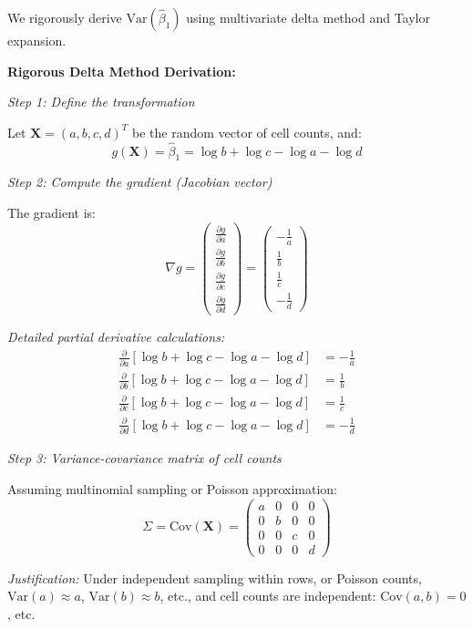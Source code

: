 \documentclass[12pt]{article}
\begin{document}
\begin{solution}
We rigorously derive $\text{Var}(\hat{\beta}_1)$ using multivariate delta method and Taylor expansion.

\textbf{Rigorous Delta Method Derivation:}

\textit{Step 1: Define the transformation}

Let $\mathbf{X} = (a, b, c, d)^T$ be the random vector of cell counts, and:
\[
g(\mathbf{X}) = \hat{\beta}_1 = \log b + \log c - \log a - \log d
\]

\textit{Step 2: Compute the gradient (Jacobian vector)}

The gradient is:
\[
\nabla g = \begin{pmatrix}
\frac{\partial g}{\partial a} \\
\frac{\partial g}{\partial b} \\
\frac{\partial g}{\partial c} \\
\frac{\partial g}{\partial d}
\end{pmatrix} = \begin{pmatrix}
-\frac{1}{a} \\
\frac{1}{b} \\
\frac{1}{c} \\
-\frac{1}{d}
\end{pmatrix}
\]

\textit{Detailed partial derivative calculations:}
\begin{align*}
\frac{\partial}{\partial a}[\log b + \log c - \log a - \log d] &= -\frac{1}{a} \\
\frac{\partial}{\partial b}[\log b + \log c - \log a - \log d] &= \frac{1}{b} \\
\frac{\partial}{\partial c}[\log b + \log c - \log a - \log d] &= \frac{1}{c} \\
\frac{\partial}{\partial d}[\log b + \log c - \log a - \log d] &= -\frac{1}{d}
\end{align*}

\textit{Step 3: Variance-covariance matrix of cell counts}

Assuming multinomial sampling or Poisson approximation:
\[
\Sigma = \text{Cov}(\mathbf{X}) = \begin{pmatrix}
a & 0 & 0 & 0 \\
0 & b & 0 & 0 \\
0 & 0 & c & 0 \\
0 & 0 & 0 & d
\end{pmatrix}
\]

\textit{Justification:} Under independent sampling within rows, or Poisson counts, $\text{Var}(a) \approx a$, $\text{Var}(b) \approx b$, etc., and cell counts are independent: $\text{Cov}(a,b) = 0$, etc.


\end{solution}
\end{document}
